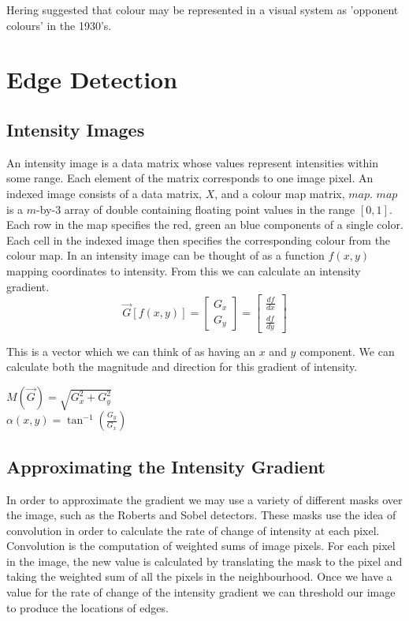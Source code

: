 \documentclass{article}
\begin{document}
	\par 
	Hering suggested that colour may be represented in a visual system as 'opponent colours' in the 1930's.
	
	
	\section{Edge Detection}
	\subsection{Intensity Images}
	An intensity image is a data matrix whose values represent intensities within some range. Each element of the matrix corresponds to one image pixel. An indexed image consists of a data matrix, $X$, and a colour map matrix, $map$. $map$ is a $m$-by-3 array of double containing floating point values in the range $[0, 1]$. Each row in the map specifies the red, green an blue components of a single color. Each cell in the indexed image then specifies the corresponding colour from the colour map. In an intensity image can be thought of as a function $f(x, y)$ mapping coordinates to intensity. From this we can calculate an intensity gradient.
	\begingroup
	\renewcommand*{\arraystretch}{1.5}
	\[ \overrightarrow{G}[f(x,y)] = \begin{bmatrix}G_{x} \\ G_{y} \end{bmatrix} = \begin{bmatrix} \frac{df}{dx} \\ \frac{df}{dy} \end{bmatrix} \]	
	\endgroup

	 This is a vector which we can think of as having an $x$ and $y$ component. We can calculate both the magnitude and direction for this gradient of intensity. 
	\begin{multicols}{2}
		\noindent
		\centering
			$M(\overrightarrow{G}) = \sqrt{G_{x}^{2} + G_{y}^{2}}$ \\
			$\alpha(x, y) = \tan^{-1}\left(\frac{G_y}{G_x}\right)$
	\end{multicols}
	
	\subsection{Approximating the Intensity Gradient}
	In order to approximate the gradient we may use a variety of different masks over the image, such as the Roberts and Sobel detectors. These masks use the idea of convolution in order to calculate the rate of change of intensity at each pixel. Convolution is the computation of weighted sums of image pixels. For each pixel in the image, the new value is calculated by translating the mask to the pixel and taking the weighted sum of all the pixels in the neighbourhood. Once we have a value for the rate of change of the intensity gradient we can threshold our image to produce the locations of edges.
	
\end{document}
